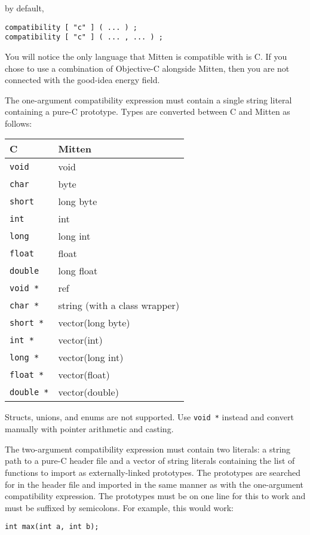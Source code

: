\documentclass[10pt,a4paper]{article}
\begin{document}
by default,
\begin{verbatim}
compatibility [ "c" ] ( ... ) ;
compatibility [ "c" ] ( ... , ... ) ;
\end{verbatim}

You will notice the only language that Mitten is compatible with is C. If you chose to use a combination of Objective-C alongside Mitten, then you are not connected with the good-idea energy field.

The one-argument compatibility expression must contain a single string literal containing a pure-C prototype. Types are converted between C and Mitten as follows:

\begin{tabular}{l l}
C & Mitten \\
\hline
\verb|void| & void \\
\verb|char| & byte \\
\verb|short| & long byte \\
\verb|int| & int \\
\verb|long| & long int \\
\verb|float| & float \\
\verb|double| & long float \\
\verb|void *| & ref \\
\verb|char *| & string (with a class wrapper) \\
\verb|short *| & vector(long byte) \\
\verb|int *| & vector(int) \\
\verb|long *| & vector(long int) \\
\verb|float *| & vector(float) \\
\verb|double *| & vector(double) \\
\end{tabular}

Structs, unions, and enums are not supported. Use \verb|void *| instead and convert manually with pointer arithmetic and casting.

The two-argument compatibility expression must contain two literals: a string path to a pure-C header file and a vector of string literals containing the list of functions to import as externally-linked prototypes. The prototypes are searched for in the header file and imported in the same manner as with the one-argument compatibility expression. The prototypes must be on one line for this to work and must be suffixed by semicolons. For example, this would work:
\begin{verbatim}
int max(int a, int b);
\end{verbatim}
\end{document}
